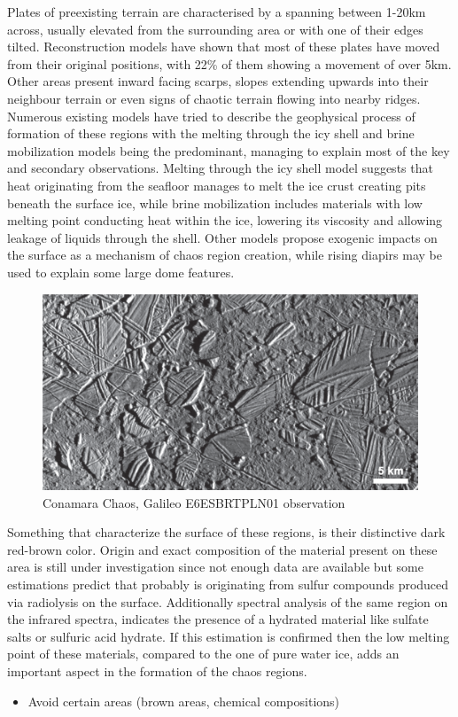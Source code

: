 Plates of preexisting terrain are characterised by a spanning between 1-20km across, usually elevated from the surrounding area or with one of their edges tilted. Reconstruction models have shown that most of these plates have moved from their original positions, with 22\% of them showing a movement of over 5km. Other areas present inward facing scarps, slopes extending upwards into their neighbour terrain or even signs of chaotic terrain flowing into nearby ridges.
Numerous existing models have tried to describe the geophysical process of formation of these regions with the melting through the icy shell and brine mobilization models being the predominant, managing to explain most of the key and secondary observations. Melting through the icy shell model suggests that heat originating from the seafloor manages to melt the ice crust creating pits beneath the surface ice, while brine mobilization includes materials with low melting point conducting heat within the ice, lowering its viscosity and allowing leakage of liquids through the shell. Other models propose exogenic impacts on the surface as a mechanism of chaos region creation, while rising diapirs may be used to explain some large dome features.  
\begin{figure}[htb]
    \centering
    \includegraphics[scale=0.3]{figures/Orbiter/chaos.png}
    \caption{Conamara Chaos, Galileo E6ESBRTPLN01 observation \cite{chaosterrain}}
    \label{fig:conamara_chaos}
\end{figure}
Something that characterize the surface of these regions, is their distinctive dark red-brown color. Origin and exact composition of the material present on these area is still under investigation since not enough data are available but some estimations predict that probably is originating from sulfur compounds produced via radiolysis on the surface. Additionally spectral analysis of the same region on the infrared spectra, indicates the presence of a hydrated material like sulfate salts or sulfuric acid hydrate. If this estimation is confirmed then the low melting point of these materials, compared to the one of pure water ice, adds an important aspect in the formation of the chaos regions.
\begin{itemize}
    \item Avoid certain areas (brown areas, chemical compositions)
\end{itemize}

